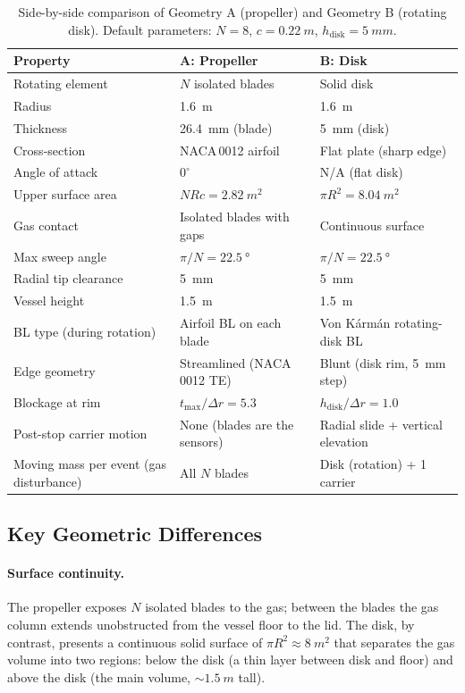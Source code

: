 \documentclass[11pt,a4paper]{article}
\begin{document}
\begin{table}[H]
\centering
\caption{Side-by-side comparison of Geometry A (propeller) and
Geometry B (rotating disk). Default parameters: $N = 8$,
$c = \SI{0.22}{m}$, $h_\mathrm{disk} = \SI{5}{mm}$.}
\label{tab:comparison}
\begin{tabular}{lll}
\toprule
Property & A: Propeller & B: Disk \\
\midrule
Rotating element
  & $N$ isolated blades
  & Solid disk \\
Radius
  & \SI{1.6}{m}
  & \SI{1.6}{m} \\
Thickness
  & \SI{26.4}{mm} (blade)
  & \SI{5}{mm} (disk) \\
Cross-section
  & NACA\,0012 airfoil
  & Flat plate (sharp edge) \\
Angle of attack
  & $0^\circ$
  & N/A (flat disk) \\
Upper surface area
  & $N R c = \SI{2.82}{m^2}$
  & $\pi R^2 = \SI{8.04}{m^2}$ \\
Gas contact
  & Isolated blades with gaps
  & Continuous surface \\
Max sweep angle
  & $\pi/N = \SI{22.5}{\degree}$
  & $\pi/N = \SI{22.5}{\degree}$ \\
Radial tip clearance
  & \SI{5}{mm}
  & \SI{5}{mm} \\
Vessel height
  & \SI{1.5}{m}
  & \SI{1.5}{m} \\
BL type (during rotation)
  & Airfoil BL on each blade
  & Von K\'arm\'an rotating-disk BL \\
Edge geometry
  & Streamlined (NACA\,0012 TE)
  & Blunt (disk rim, \SI{5}{mm} step) \\
Blockage at rim
  & $t_\mathrm{max}/\Delta r = 5.3$
  & $h_\mathrm{disk}/\Delta r = 1.0$ \\
Post-stop carrier motion
  & None (blades are the sensors)
  & Radial slide + vertical elevation \\
Moving mass per event (gas disturbance)
  & All $N$ blades
  & Disk (rotation) + 1 carrier \\
\bottomrule
\end{tabular}
\end{table}

\subsection{Key Geometric Differences}

\paragraph{Surface continuity.}
The propeller exposes $N$ isolated blades to the gas; between the
blades the gas column extends unobstructed from the vessel floor to
the lid. The disk, by contrast, presents a continuous solid surface of
$\pi R^2 \approx \SI{8}{m^2}$ that separates the gas volume into two
regions: below the disk (a thin layer between disk and floor) and above
the disk (the main volume, $\sim\SI{1.5}{m}$ tall).
\end{document}
